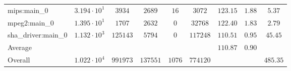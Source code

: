 \begin{tabular}{|l|c|c|c|c|c|c|c|c|}
mips:main\_0            & $ 3.194 \cdot 10^{1} $ & $ 3934   $ & $ 2689   $ & $ 16   $ & $ 3072   $ & $ 123.15      $ & $ 1.88    $ & $ 5.37    $ \\
mpeg2:main\_0           & $ 1.395 \cdot 10^{1} $ & $ 1707   $ & $ 2632   $ & $ 0    $ & $ 32768  $ & $ 122.40      $ & $ 1.83    $ & $ 2.79    $ \\
sha\_driver:main\_0     & $ 1.132 \cdot 10^{3} $ & $ 125143 $ & $ 5794   $ & $ 0    $ & $ 117248 $ & $ 110.51      $ & $ 0.95    $ & $ 45.45   $ \\
\hline
Average                 & $                    $ & $        $ & $        $ & $      $ & $        $ & $ 110.87      $ & $ 0.90    $ & $         $ \\
\hline
Overall                 & $ 1.022 \cdot 10^{4} $ & $ 991973 $ & $ 137551 $ & $ 1076 $ & $ 774120 $ & $             $ & $         $ & $ 485.35  $ \\
\hline
\end{tabular}
